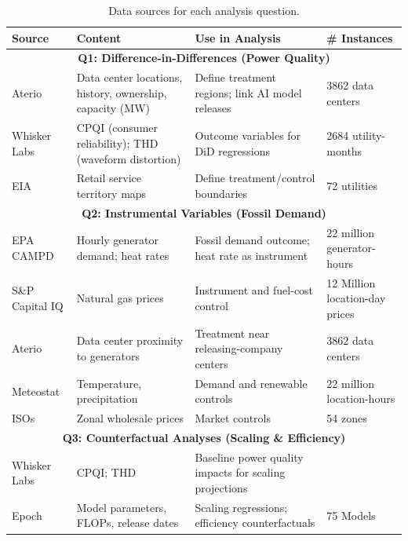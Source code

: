 \documentclass[sigconf,authordraft]{acmart}
\begin{document}
\begin{table}[htbp]
\scriptsize %
\centering
\caption{Data sources for each analysis question.}
\label{tab:DataSources}
\begin{threeparttable}
\begin{tabularx}{\linewidth}{lXXl}
\toprule
\textbf{Source} & \textbf{Content} & \textbf{Use in Analysis} & \textbf{\# Instances} \\
\midrule
\multicolumn{4}{c}{\textbf{Q1: Difference-in-Differences (Power Quality)}} \\
\midrule
Aterio & Data center locations, history, ownership, capacity (MW) & Define treatment regions; link AI model releases & 3862 data centers\\
Whisker Labs & CPQI (consumer reliability); THD (waveform distortion) & Outcome variables for DiD regressions & 2684 utility-months\\
EIA & Retail service territory maps & Define treatment/control boundaries & 72 utilities\\
\midrule
\multicolumn{4}{c}{\textbf{Q2: Instrumental Variables (Fossil Demand)}} \\
\midrule
EPA CAMPD & Hourly generator demand; heat rates & Fossil demand outcome; heat rate as instrument & 22 million generator-hours\\
S\&P Capital IQ & Natural gas prices & Instrument and fuel-cost control &12 Million location-day prices \\
Aterio & Data center proximity to generators & Treatment near releasing-company centers & 3862 data centers\\
Meteostat & Temperature, precipitation & Demand and renewable controls & 22 million location-hours\\
ISOs & Zonal wholesale prices & Market controls & 54 zones\\
\midrule
\multicolumn{4}{c}{\textbf{Q3: Counterfactual Analyses (Scaling \& Efficiency)}} \\
\midrule
Whisker Labs & CPQI; THD & Baseline power quality impacts for scaling projections & \\
Epoch & Model parameters, FLOPs, release dates & Scaling regressions; efficiency counterfactuals & 75 Models\\
\bottomrule
\end{tabularx}
\end{threeparttable}
\end{table}
\end{document}
